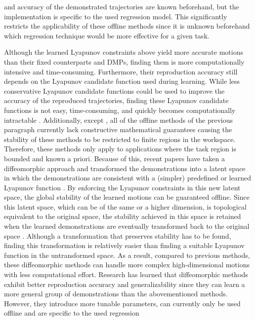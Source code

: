 and accuracy of the demonstrated trajectories are known beforehand, but the implementation is specific to the used regression model. This significantly restricts the applicability of these offline methods since it is unknown beforehand which regression technique would be more effective for a given task.

Although the learned Lyapunov constraints above yield more accurate motions than their fixed counterparts and DMPs, finding them is more computationally intensive and time-consuming. Furthermore, their reproduction accuracy still depends on the Lyapunov candidate function used during learning. While less conservative Lyapunov candidate functions could be used to improve the accuracy of the reproduced trajectories, finding these Lyapunov candidate functions is not easy, time-consuming, and quickly becomes computationally intractable \cite{ravanbakhshLearningControlLyapunov2019,havensImitationLearningLinear2021,tesfazgiInverseReinforcementLearning2021}. Additionally, except \cite{jinLearningNeuralshapedQuadratic2023}, all of the offline methods of the previous paragraph currently lack constructive mathematical guarantees causing the stability of these methods to be restricted to finite regions in the workspace. Therefore, these methods only apply to applications where the task region is bounded and known a priori. Because of this, recent papers have taken a diffeomorphic approach and transformed the demonstrations into a latent space in which the demonstrations are consistent with a (simpler) predefined or learned Lyapunov function \cite{neumannLearningRobotMotions2015,perrinFastDiffeomorphicMatching2016,jinLearningAccurateStable2019,ranaEuclideanizingFlowsDiffeomorphic2020,gaoLearningDynamicalSystem2021,urainImitationFlowLearningDeep2020,takeishiLearningDynamicsModels2021,ficheraLinearizationIdentificationMultipleAttractor2022,guptaLearningHighDimensional2022,zhiDiffeomorphicTransformsGeneralised2022,zhangLearningAccurateStable2022,saverianoLearningStableRobotic2022,urainLearningStableVector2022,wangLearningDeepRobotic2022,zhangLearningRiemannianStable2022}. By enforcing the Lyapunov constraints in this new latent space, the global stability of the learned motions can be guaranteed offline. Since this latent space, which can be of the same or a higher dimension, is topological equivalent to the original space, the stability achieved in this space is retained when the learned demonstrations are eventually transformed back to the original space \cite{leeIntroductionTopologicalManifolds2011,leeIntroductionSmoothManifolds2012,leeIntroductionRiemannianManifolds2018}. Although a transformation that preserves stability has to be found, finding this transformation is relatively easier than finding a suitable Lyapunov function in the untransformed space. As a result, compared to previous methods, these diffeomorphic methods can handle more complex high-dimensional motions with less computational effort. Research has learned that diffeomorphic methods exhibit better reproduction accuracy and generalizability since they can learn a more general group of demonstrations than the abovementioned methods. However, they introduce more tunable parameters, can currently only be used offline and are specific to the used regression 